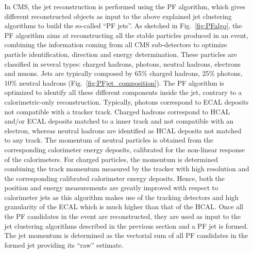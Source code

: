 In CMS, the jet reconstruction is performed using the PF algorithm, which gives different reconstructed objects as input to the above explained jet clustering algorithms to build the so-called ``PF jets''.
As sketched in Fig.~\ref{fig:PFalgo}, the PF algorithm aims at reconstructing all the stable particles produced in an event, combining the information coming from all CMS sub-detectors to optimize particle identification, direction and energy determination. These particles are classified in several types: charged hadrons, photons, neutral hadrons, electrons and muons. Jets are typically composed by 65\% charged hadrons, 25\% photons, 10\% neutral hadrons (Fig.~\ref{fig:PFjet_composition}). The PF algorithm is optimized to identify all these different components inside the jet, contrary to a calorimetric-only reconstruction. Typically, photons correspond to ECAL deposits not compatible with a tracker track. Charged hadrons correspond to HCAL and/or ECAL deposits matched to a inner track and not compatible with an electron, whereas neutral hadrons are identified as HCAL deposits not matched to any track.
The momentum of neutral particles is obtained from the corresponding calorimeter energy deposits, calibrated for the non-linear response of the calorimeters.
For charged particles, the momentum is determined combining the track momentum measured by the tracker with high resolution and the corresponding calibrated calorimeter energy deposits.
Hence, both the position and energy measurements are greatly improved with respect to calorimeter jets as this algorithm makes use of the tracking detectors and high granularity of the ECAL which is much higher than that of the HCAL. Once all the PF candidates in the event are reconstructed, they are used as input to the jet clustering algorithms described in the previous section and a PF jet is formed.
The jet momentum is determined as the vectorial sum of all PF candidates in the formed jet providing its ``raw'' estimate. 

